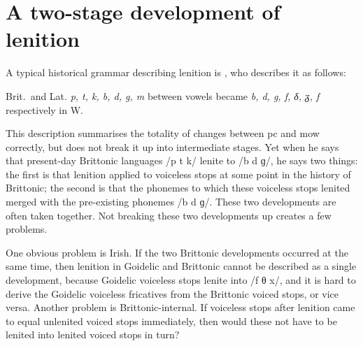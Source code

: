 \message{ !name(../main.tex)}\documentclass[
a4paper,
12pt,
twoside,
openright
]{memoir}
\newcommand{\onesp}[1]{\begin{spacing}{1}#1\end{spacing}}
\newcommand{\tqt}[3]{%
  \begin{displayquote}%
    {\small\onesp{#1~\autocite[#3]{#2}}}%
    \end{displayquote}%
  }%
\begin{document}
\section{A two-stage development of lenition}
\label{sec:two-stage-devel}
A typical historical grammar describing lenition is \textcite{Mor_Welsh13}, who describes it as follows:
\tqt{Brit.\ and Lat. \textit{p, t, k, b, d, g, m} between vowels became \textit{b, d, g, f, δ, ᵹ, f} respectively in W.}{Mor_Welsh13}{§~103}
This description summarises the totality of changes between \gls{pc} and \gls{mow} correctly, but does not break it up into intermediate stages. 
Yet when he says that present-day Brittonic languages /p t k/ lenite to /b d ɡ/, he says two things: the first is that lenition applied to voiceless stops at some point in the history of Brittonic; the second is that the phonemes to which these voiceless stops lenited merged with the pre-existing phonemes /b d ɡ/. These two developments are often taken together.  Not breaking these two developments up creates a few problems.

One obvious problem is Irish. If the two Brittonic developments occurred at the same time, then lenition in Goidelic and Brittonic cannot be described as a single development, because Goidelic voiceless stops lenite into /f θ x/, and it is hard to derive the Goidelic  voiceless fricatives from the Brittonic voiced stops, or vice versa. Another problem is Brittonic-internal. If voiceless stops after lenition came to equal unlenited voiced stops immediately, then would these not have to be lenited into lenited voiced stops in turn? 
\end{document}
